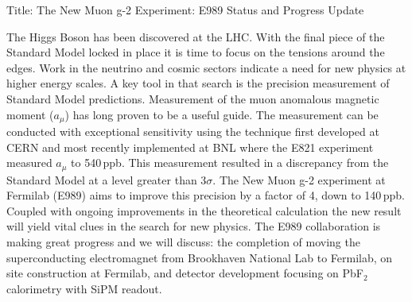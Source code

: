 Title: The New Muon g-2 Experiment: E989 Status and Progress Update

The Higgs Boson has been discovered at the LHC. With the final piece of the Standard Model locked in place it is time to focus on the tensions around the edges. Work in the neutrino and cosmic sectors indicate a need for new physics at higher energy scales. A key tool in that search is the precision measurement of Standard Model predictions. Measurement of the muon anomalous magnetic moment ($a_{\mu}$) has long proven to be a useful guide. The measurement can be conducted with exceptional sensitivity using the technique first developed at CERN and most recently implemented at BNL where the E821 experiment measured $a_{\mu}$ to 540$\,$ppb. This measurement resulted in a discrepancy from the Standard Model at a level greater than 3$\sigma$. The New Muon g-2 experiment at Fermilab (E989) aims to improve this precision by a factor of 4, down to 140$\,$ppb. Coupled with ongoing improvements in the theoretical calculation the new result will yield vital clues in the search for new physics. 
The E989 collaboration is making great progress and we will discuss: the completion of moving the superconducting electromagnet from Brookhaven National Lab to Fermilab, on site construction at Fermilab, and detector development focusing on PbF$_{2}$ calorimetry with SiPM readout.
